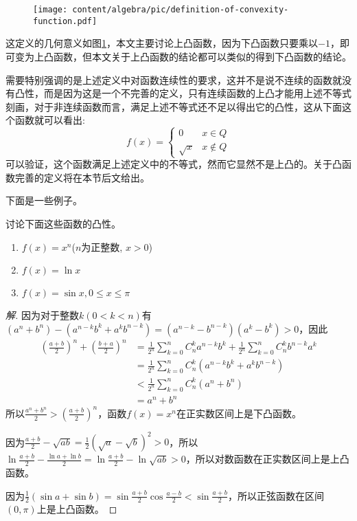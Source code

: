 \begin{figure}[htbp]
  \centering
\texttt{[image: content/algebra/pic/definition-of-convexity-function.pdf]}
\caption{}
\label{fig:definition-of-convexity-function}
\end{figure}

这定义的几何意义如图\ref{fig:definition-of-convexity-function}，本文主要讨论上凸函数，因为下凸函数只要乘以$-1$，即可变为上凸函数，但本文关于上凸函数的结论都可以类似的得到下凸函数的结论。

需要特别强调的是上述定义中对函数连续性的要求，这并不是说不连续的函数就没有凸性，而是因为这是一个不完善的定义，只有连续函数的上凸才能用上述不等式刻画，对于非连续函数而言，满足上述不等式还不足以得出它的凸性，这从下面这个函数就可以看出:
\begin{equation*}
  f(x) =
  \left\{
      \begin{array}{ll}
        0 & x \in Q \\
        \sqrt{x} &  x \notin Q
      \end{array}
  \right.
\end{equation*}
可以验证，这个函数满足上述定义中的不等式，然而它显然不是上凸的。关于凸函数完善的定义将在本节后文给出。

下面是一些例子。

\begin{example}
  讨论下面这些函数的凸性。
  \begin{enumerate}
  \item $f(x)=x^n$($n$为正整数, $x>0$)
  \item $f(x)=\ln{x}$
  \item $f(x)=\sin{x}, 0 \leqslant x \leqslant \pi$
  \end{enumerate}
\end{example}

\begin{proof}[解]
因为对于整数$k(0 < k < n)$有$(a^n+b^n)-(a^{n-k}b^k+a^kb^{n-k})=(a^{n-k}-b^{n-k})(a^k-b^k)>0$，因此
\begin{equation}
  \begin{split}
\left( \frac{a+b}{2} \right)^n + \left( \frac{b+a}{2} \right)^n & = \frac{1}{2^n} \sum_{k=0}^nC_n^ka^{n-k}b^k + \frac{1}{2^n}\sum_{k=0}^nC_n^kb^{n-k}a^k \\
& = \frac{1}{2^n} \sum_{k=0}^n C_n^k \left( a^{n-k}b^k+a^kb^{n-k} \right) \\
& < \frac{1}{2^n} \sum_{k=0}^n C_n^k \left( a^n+b^n \right) \\
& = a^n+b^n
\end{split}
\end{equation}
所以$\frac{a^n+b^n}{2}>\left( \frac{a+b}{2} \right)^n$，函数$f(x)=x^n$在正实数区间上是下凸函数。

因为$\frac{a+b}{2}-\sqrt{ab}=\frac{1}{2}(\sqrt{a}-\sqrt{b})^2>0$，所以 $\ln{\frac{a+b}{2}}-\frac{\ln{a}+\ln{b}}{2}=\ln{\frac{a+b}{2}}-\ln{\sqrt{ab}}>0$，所以对数函数在正实数区间上是上凸函数。

因为$\frac{1}{2}(\sin{a}+\sin{b})=\sin{\frac{a+b}{2}}\cos{\frac{a-b}{2}} < \sin{\frac{a+b}{2}}$，所以正弦函数在区间$(0,\pi)$上是上凸函数。
\end{proof}

